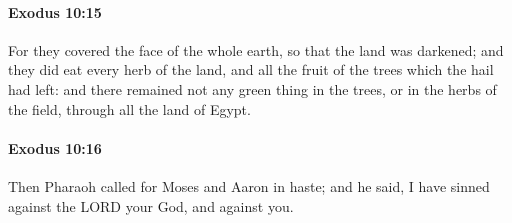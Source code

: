 		\paragraph{Exodus 10:15} %
			\label{EXODUS-10-15}

			For they covered the face of the whole earth, so that the land was darkened; and they did eat every herb of the land, and all the fruit of the trees which the hail had left: and there remained not any green thing in the trees, or in the herbs of the field, through all the land of Egypt.


		\paragraph{Exodus 10:16} %
			\label{EXODUS-10-16}

			Then Pharaoh called for Moses and Aaron in haste; and he said, I have sinned against the LORD your God, and against you.

